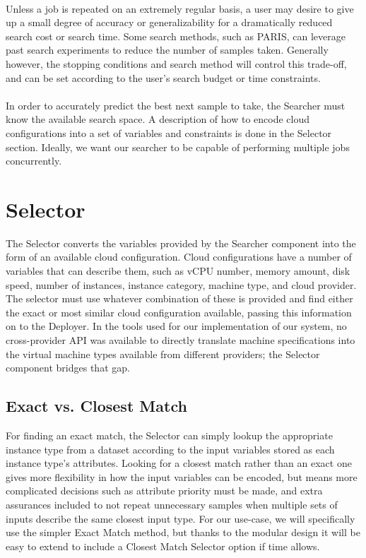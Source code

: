 \documentclass{report}
\begin{document}
\paragraph{}
Unless a job is repeated on an extremely regular basis, a user may desire to give up a small degree of accuracy or generalizability for a dramatically reduced search cost or search time. Some search methods, such as PARIS\cite{Yadwadkar2017}, can leverage past search experiments to reduce the number of samples taken. Generally however, the stopping conditions and search method will control this trade-off, and can be set according to the user's search budget or time constraints. 

\paragraph{}
In order to accurately predict the best next sample to take, the Searcher must know the available search space.  A description of how to encode cloud configurations into a set of variables and constraints is done in the Selector section. Ideally, we want our searcher to be capable of performing multiple jobs concurrently.

\section{Selector}
The Selector converts the variables provided by the Searcher component into the form of an available cloud configuration. Cloud configurations have a number of variables that can describe them, such as vCPU number, memory amount, disk speed, number of instances, instance category, machine type, and cloud provider. The selector must use whatever combination of these is provided and find either the exact or most similar cloud configuration available, passing this information on to the Deployer. In the tools used for our implementation of our system, no cross-provider API was available to directly translate machine specifications into the virtual machine types available from different providers; the Selector component bridges that gap.

\subsection{Exact vs. Closest Match}
For finding an exact match, the Selector can simply lookup the appropriate instance type from a dataset according to the input variables stored as each instance type's attributes. Looking for a closest match rather than an exact one gives more flexibility in how the input variables can be encoded, but means more complicated decisions such as attribute priority must be made, and extra assurances included to not repeat unnecessary samples when multiple sets of inputs describe the same closest input type. For our use-case, we will specifically use the simpler Exact Match method, but thanks to the modular design it will be easy to extend to include a Closest Match Selector option if time allows.
\end{document}
